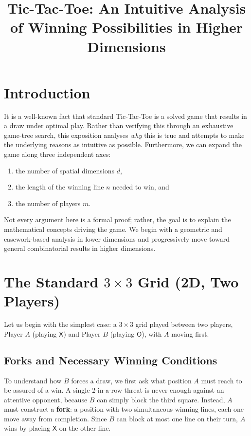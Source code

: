 \documentclass[11pt, a4paper]{article}
\title{\textbf{Tic-Tac-Toe: An Intuitive Analysis of Winning Possibilities in Higher Dimensions}}
\author{}
\date{}
\begin{document}
\maketitle

\section{Introduction}
It is a well-known fact that standard Tic-Tac-Toe is a solved game that results in a draw under optimal play. Rather than verifying this through an exhaustive game-tree search, this exposition analyses \emph{why} this is true and attempts to make the underlying reasons as intuitive as possible. Furthermore, we can expand the game along three independent axes:
\begin{enumerate}
    \item[(i)] the number of spatial dimensions $d$,
    \item[(ii)] the length of the winning line $n$ needed to win, and
    \item[(iii)] the number of players $m$.
\end{enumerate}
Not every argument here is a formal proof; rather, the goal is to explain the mathematical concepts driving the game. We begin with a geometric and casework-based analysis in lower dimensions and progressively move toward general combinatorial results in higher dimensions.

\section{The Standard $3 \times 3$ Grid (2D, Two Players)}
Let us begin with the simplest case: a $3 \times 3$ grid played between two players, Player $A$ (playing $\mathsf{X}$) and Player $B$ (playing $\mathsf{O}$), with $A$ moving first.

\subsection{Forks and Necessary Winning Conditions}
To understand how $B$ forces a draw, we first ask what position $A$ must reach to be assured of a win. A single $2$-in-a-row threat is never enough against an attentive opponent, because $B$ can simply block the third square. Instead, $A$ must construct a \textbf{fork}: a position with two simultaneous winning lines, each one move away from completion. Since $B$ can block at most one line on their turn, $A$ wins by placing $\mathsf{X}$ on the other line.
\end{document}
